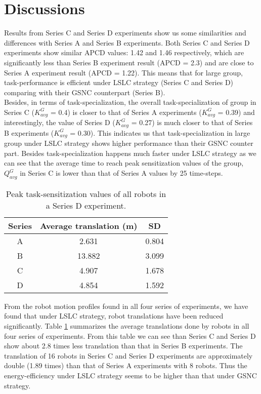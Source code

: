 \section{Discussions}
\label{local-comm:discuss}
Results from Series C and Series D experiments show us some similarities and differences with Series A and Series B experiments. Both Series C and Series D experiments show similar APCD values: 1.42 and 1.46 respectively, which are significantly less than Series B experiment result (APCD = 2.3) and are close to Series A experiment result (APCD = 1.22). This means that for large group, task-performance  is efficient under LSLC strategy (Series C and Series D) comparing with their GSNC counterpart (Series B). \\
Besides, in terms of task-specialization, the overall task-specialization of group in Series C ($K^G_{avg}$ = 0.4) is  closer to that of Series A experiments ($K^G_{avg}$ = 0.39) and interestingly, the value of  Series D ($K^G_{avg}$ = 0.27) is  much closer to that of Series B experiments ($K^G_{avg}$ = 0.30). This indicates us that task-specialization in large group under LSLC strategy shows higher performance than their GSNC counter part. Besides task-specialization happens much faster under LSLC strategy as we can see that the average time to reach peak sensitization values  of the group,  $Q^G_{avg}$ in Series C is lower than that of Series A values by 25 time-steps.\\ 
\begin{table}
\begin{center}
\caption{Peak task-sensitization values of all robots in a Series D experiment.}
\begin{tabular}{|c|c|c|}
\hline \textbf{Series} & \textbf{Average translation (m)} & \textbf{SD} \\ 
\hline A & 2.631 & 0.804\\ 
\hline B & 13.882 & 3.099\\
\hline C & 4.907 & 1.678\\
\hline D & 4.854 & 1.592\\
\hline
\end{tabular}
\label{table:motion-cmp} 
\end{center}
\end{table}
From the robot motion profiles found in all four series of experiments, we have found that under LSLC strategy, robot translations have been reduced significantly. Table \ref{table:motion-cmp} summarizes the average translations done by robots in all four series of experiments. From this table we can see than Series C and Series D show about 2.8 times less translation than that in Series B experiments. The translation of 16 robots in Series C and Series D experiments are approximately double (1.89 times) than that of Series A experiments with 8 robots.  Thus the energy-efficiency under LSLC strategy seems to be higher  than that under GSNC strategy.\\

